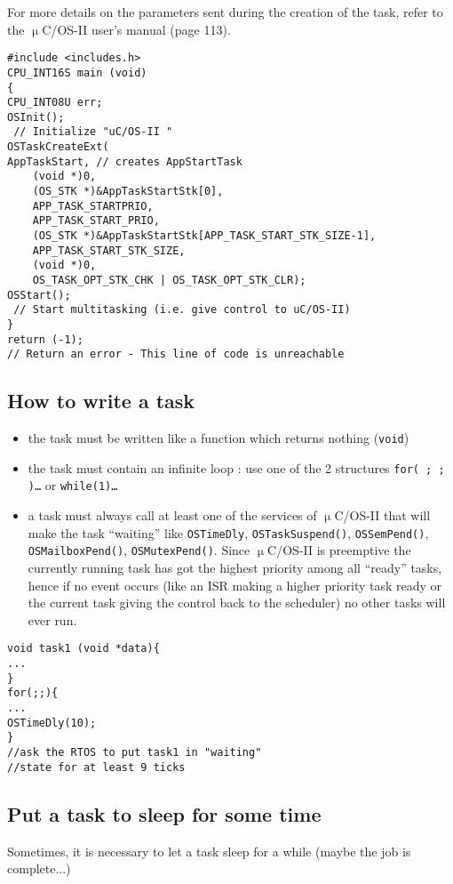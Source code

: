 \documentclass[10pt,a4paper]{article}
\theoremstyle{definition}%
\newcommand{\uCOSII}{$\upmu$C/OS-II }
\newcommand{\kw}[1]{\texttt{#1}}
\begin{document}
For more details on the parameters sent during the creation of the task, refer to the \uCOSII user's
manual (page 113).
\newpage
\begin{lstlisting}[caption={Function main.c}, label={lst:listing 1}]
#include <includes.h>
CPU_INT16S main (void)
{
CPU_INT08U err;
OSInit();
 // Initialize "uC/OS-II "
OSTaskCreateExt(
AppTaskStart, // creates AppStartTask
	(void *)0,
	(OS_STK *)&AppTaskStartStk[0],
	APP_TASK_STARTPRIO,
	APP_TASK_START_PRIO,
	(OS_STK *)&AppTaskStartStk[APP_TASK_START_STK_SIZE-1],
	APP_TASK_START_STK_SIZE,
	(void *)0,
	OS_TASK_OPT_STK_CHK | OS_TASK_OPT_STK_CLR);
OSStart();
 // Start multitasking (i.e. give control to uC/OS-II)
}
return (-1);
// Return an error - This line of code is unreachable

\end{lstlisting}

\subsection{How to write a task}
\begin{itemize}
\item the task must be written like a function which returns nothing (\kw{void})
\item the task must contain an infinite loop : use one of the 2 structures \kw{for( ; ; ){\dots}} or \kw{while(1){\dots}}
\item a task must always call at least one of the services of \uCOSII that will make the task “waiting”
like \kw{OSTimeDly}, \kw{OSTaskSuspend()}, \kw{OSSemPend()}, \kw{OSMailboxPend()}, \kw{OSMutexPend()}. Since
\uCOSII is preemptive the currently running task has got the highest priority among all “ready”
tasks, hence if no event occurs (like an ISR making a higher priority task ready or the current task
giving the control back to the scheduler) no other tasks will ever run.

\end{itemize}

\begin{lstlisting}[caption={task1.c}, label={lst:listing 2}]
void task1 (void *data){
...
}
for(;;){
...
OSTimeDly(10);
}
//ask the RTOS to put task1 in "waiting"
//state for at least 9 ticks

\end{lstlisting}

\subsection{Put a task to sleep for some time}
Sometimes, it is necessary to let a task sleep for a while (maybe the job is complete...) 
\end{document}
